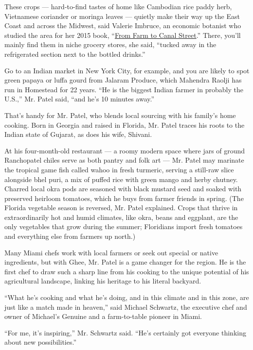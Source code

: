 These crops --- hard-to-find tastes of home like Cambodian rice paddy
herb, Vietnamese coriander or moringa leaves --- quietly make their way
up the East Coast and across the Midwest, said Valerie Imbruce, an
economic botanist who studied the area for her 2015 book,
``\href{http://www.cornellpress.cornell.edu/book/?GCOI=80140100191750}{From
Farm to Canal Street}.'' There, you'll mainly find them in niche grocery
stores, she said, ``tucked away in the refrigerated section next to the
bottled drinks.''

Go to an Indian market in New York City, for example, and you are likely
to spot green papaya or luffa gourd from Jalaram Produce, which Mahendra
Raolji has run in Homestead for 22 years. ``He is the biggest Indian
farmer in probably the U.S.,'' Mr. Patel said, ``and he's 10 minutes
away.''

That's handy for Mr. Patel, who blends local sourcing with his family's
home cooking. Born in Georgia and raised in Florida, Mr. Patel traces
his roots to the Indian state of Gujarat, as does his wife, Shivani.

At his four-month-old restaurant --- a roomy modern space where jars of
ground Ranchopatel chiles serve as both pantry and folk art --- Mr.
Patel may marinate the tropical game fish called wahoo in fresh
turmeric, serving a still-raw slice alongside bhel puri, a mix of puffed
rice with green mango and herby chutney. Charred local okra pods are
seasoned with black mustard seed and soaked with preserved heirloom
tomatoes, which he buys from farmer friends in spring. (The Florida
vegetable season is reversed, Mr. Patel explained. Crops that thrive in
extraordinarily hot and humid climates, like okra, beans and eggplant,
are the only vegetables that grow during the summer; Floridians import
fresh tomatoes and everything else from farmers up north.)

Many Miami chefs work with local farmers or seek out special or native
ingredients, but with Ghee, Mr. Patel is a game changer for the region.
He is the first chef to draw such a sharp line from his cooking to the
unique potential of his agricultural landscape, linking his heritage to
his literal backyard.

``What he's cooking and what he's doing, and in this climate and in this
zone, are just like a match made in heaven,'' said Michael Schwartz, the
executive chef and owner of Michael's Genuine and a farm-to-table
pioneer in Miami.

``For me, it's inspiring,'' Mr. Schwartz said. ``He's certainly got
everyone thinking about new possibilities.''

